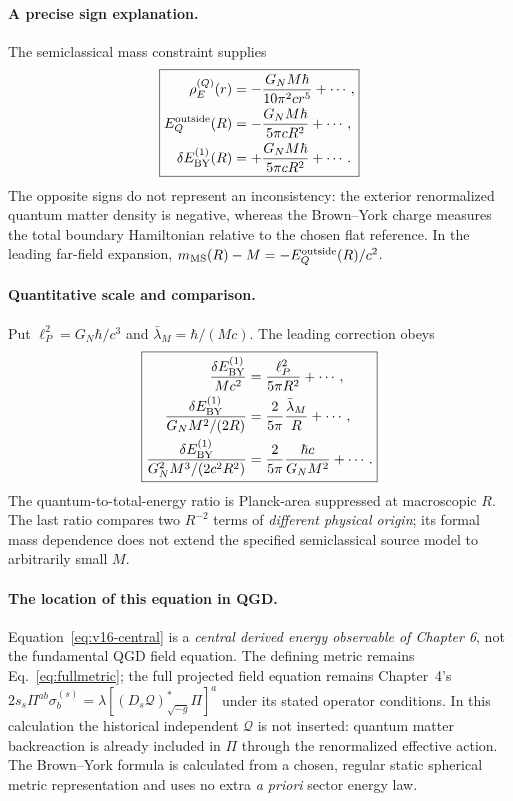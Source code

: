\documentclass[11pt,a4paper]{article}
\theoremstyle{definition}\newtheorem{definition}[theorem]{Definition}
\theoremstyle{remark}\newtheorem{remark}[theorem]{Remark}
\begin{document}
\paragraph{A precise sign explanation.}
The semiclassical mass constraint supplies
\begin{equation}\label{eq:v16-sign}
\boxed{\begin{aligned}
\rho_E^{(Q)}(r)&=-\frac{G_NM\hbar}{10\pi^2cr^5}+\cdots,\\
E_Q^{\rm outside}(R)&=-\frac{G_NM\hbar}{5\pi cR^2}+\cdots,\\
\delta E_{\rm BY}^{(1)}(R)&=+\frac{G_NM\hbar}{5\pi cR^2}+\cdots.
\end{aligned}}
\end{equation}
The opposite signs do not represent an inconsistency: the exterior
renormalized quantum matter density is negative, whereas the
Brown--York charge measures the total boundary Hamiltonian relative
to the chosen flat reference. In the leading far-field expansion,
$m_{\rm MS}(R)-M=-E_Q^{\rm outside}(R)/c^2$.

\paragraph{Quantitative scale and comparison.}
Put $\ell_P^2=G_N\hbar/c^3$ and
$\bar\lambda_M=\hbar/(Mc)$. The leading correction obeys
\begin{equation}\label{eq:v16-ratios}
\boxed{\begin{aligned}
\frac{\delta E_{\rm BY}^{(1)}}{Mc^2}
&=\frac{\ell_P^2}{5\pi R^2}+\cdots,\\
\frac{\delta E_{\rm BY}^{(1)}}{G_NM^2/(2R)}
&=\frac{2}{5\pi}\frac{\bar\lambda_M}{R}+\cdots,\\
\frac{\delta E_{\rm BY}^{(1)}}{G_N^2M^3/(2c^2R^2)}
&=\frac{2}{5\pi}\frac{\hbar c}{G_NM^2}+\cdots.
\end{aligned}}
\end{equation}
The quantum-to-total-energy ratio is Planck-area suppressed at
macroscopic $R$. The last ratio compares two $R^{-2}$ terms of
\emph{different physical origin}; its formal mass dependence does
not extend the specified semiclassical source model to arbitrarily
small $M$.

\paragraph{The location of this equation in QGD.}
Equation~\eqref{eq:v16-central} is a \emph{central derived energy
observable of Chapter 6}, not the fundamental QGD field equation.
The defining metric remains Eq.~\eqref{eq:fullmetric}; the full
projected field equation remains Chapter~4's
$2s_s\Pi^{ab}\sigma_b^{(s)}=\lambda[(D_s\mathcal Q)^*_{\sqrt{-g}}\Pi]^a$
under its stated operator conditions. In this calculation the
historical independent $\mathcal Q$ is not inserted:
quantum matter backreaction is already included in $\Pi$ through
the renormalized effective action. The Brown--York formula
is calculated from a chosen, regular static spherical metric
representation and uses no extra \emph{a priori} sector energy law.
\end{document}
